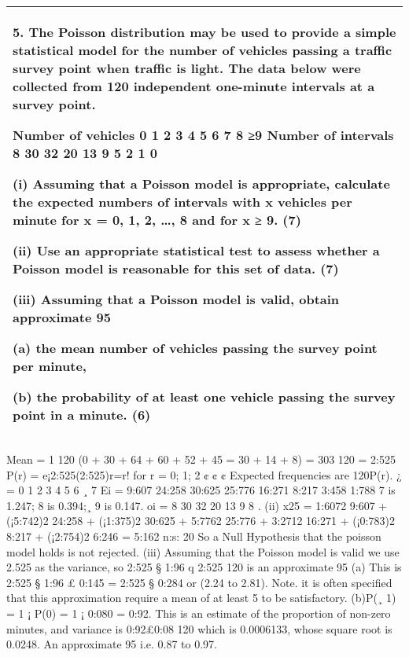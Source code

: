 \documentclass[a4paper,12pt]{article}
\begin{document}
\begin{table}[ht!]
 \centering
 \begin{tabular}{|p{15cm}|}
 \hline  
5. The Poisson distribution may be used to provide a simple statistical model for the number of vehicles passing a traffic survey point when traffic is light.  The data below were collected from 120 independent one-minute intervals at a survey point. 
 
Number of vehicles 0 1 2 3 4 5 6 7 8 ≥9 Number of intervals 8 30 32 20 13 9 5 2 1 0 
 
 
(i) Assuming that a Poisson model is appropriate, calculate the expected numbers of intervals with x vehicles per minute for x = 0, 1, 2, …, 8 and for x ≥ 9. (7) 
 
(ii) Use an appropriate statistical test to assess whether a Poisson model is reasonable for this set of data. (7) 
 
(iii) Assuming that a Poisson model is valid, obtain approximate 95%
 
(a) the mean number of vehicles passing the survey point per minute, 
 
(b) the probability of at least one vehicle passing the survey point in a minute. (6) \\ \hline
  \end{tabular}
\end{table}
\begin{enumerate}Mean =
1
120
(0 + 30 + 64 + 60 + 52 + 45 = 30 + 14 + 8) =
303
120
= 2:525
P(r) = e¡2:525(2:525)r=r! for r = 0; 1; 2 ¢ ¢ ¢
Expected frequencies are 120P(r).
¿ = 0 1 2 3 4 5 6 ¸ 7
Ei = 9:607 24:258 30:625 25:776 16:271 8:217 3:458 1:788
7 is 1.247; 8 is 0.394;¸ 9 is 0.147.
oi = 8 30 32 20 13 9 8
.
(ii)
x25
=
1:6072
9:607
+
(¡5:742)2
24:258
+
(¡1:375)2
30:625
+
5:7762
25:776
+
3:2712
16:271
+
(¡0:783)2
8:217
+
(¡2:754)2
6:246
= 5:162 n:s:
20
So a Null Hypothesis that the poisson model holds is not rejected.
(iii) Assuming that the Poisson model is valid we use 2.525 as the variance, so
2:525 § 1:96
q
2:525
120 is an approximate 95%
(a) This is 2:525 § 1:96 £ 0:145 = 2:525 § 0:284 or (2.24 to 2.81).
Note. it is often specified that this approximation require a mean of at least 5 to be
satisfactory.
(b)P(¸ 1) = 1 ¡ P(0) = 1 ¡ 0:080 = 0:92. This is an estimate of the proportion
of non-zero minutes, and variance is 0:92£0:08
120 which is 0.0006133, whose square root is
0.0248.
An approximate 95%
i.e. 0.87 to 0.97.
\end{enumerate}
\end{document}
